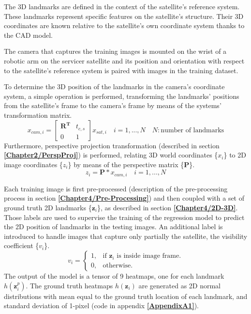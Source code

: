 The 3D landmarks are defined in the context of the satellite's reference system. These landmarks represent specific features on the satellite's structure. Their 3D coordinates are known relative to the satellite's own coordinate system thanks to the CAD model.

The camera that captures the training images is mounted on the wrist of a robotic arm on the servicer satellite and its position and orientation with respect to the satellite's reference system is paired with images in the training dataset.

To determine the 3D position of the landmarks in the camera's coordinate system, a simple operation is performed, transforming the landmarks' positions from the satellite's frame to the camera's frame by means of the systems' transformation matrix.
\begin{equation}
    x_{cam,i} = 
\begin{bmatrix}
    \textbf{R}^\textbf{T} & t_{c,s}\\
    0 & 1
\end{bmatrix}
x_{sat,i} \quad i = 1,...,N \quad N:\textrm{number of landmarks}
\end{equation}
Furthermore, perspective projection transformation (described in section \textbf{\ref{Chapter2/PerspProj}}) is performed, relating 3D world coordinates \{\(x_{i}\)\} to 2D image coordinates \{\(z_{i}\)\} by means of the perspective matrix \{\(\textbf{P}\)\}.
\begin{equation}
    z_{i} = \textbf{P}*x_{cam,i} \quad i = 1,...,N
\end{equation}

\newpage
\label{Chapter4/LandReg}
Each training image is first pre-processed (description of the pre-processing process in section \textbf{\ref{Chapter4/Pre-Processing}}) and then coupled with a set of ground truth 2D landmarks \{\(\textbf{z}_{i}\)\}, as described in section \textbf{\ref{Chapter4/2D-3D}}. Those labels are used to supervise the training of the regression model to predict the 2D position of landmarks in the testing images. An additional label is introduced to handle images that capture only partially the satellite, the visibility coefficient \{\(v_{i}\)\}.
\begin{equation}
  v_{i}=\begin{cases}
    1, & \text{if $\textbf{z}_{i}$ is inside image frame}.\\
    0, & \text{otherwise}.
  \end{cases}
\end{equation}
The output of the model is a tensor of 9 heatmaps, one for each landmark $h(\textbf{z}_{i}^p)$. The ground truth heatmaps $h(\textbf{z}_{i})$ are generated as 2D normal distributions with mean equal to the ground truth location of each landmark, and standard deviation of 1-pixel (code in appendix \textbf{\ref{AppendixA1}}).

